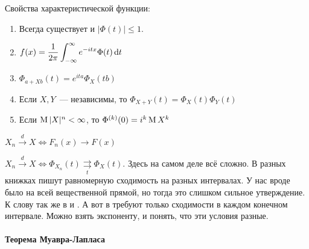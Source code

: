\documentclass[12pt,timbord]{../../../notes}
\begin{document}
\begin{prop}\label{prop:prob::charfun::charfun}
  Свойства характеристической функции:
  \begin{enumerate}
    \item Всегда существует и $|\Phi(t)| \leqslant 1$.
    \item $f(x) = \dfrac{1}{2\pi} \displaystyle\int_{-\infty}^\infty e^{-itx} \Phi(t) \,\mathrm{d} t $
    \item $\Phi_{a + Xb} (t) = e^{ita} \Phi_X (tb)$
    \item Если $X,Y$~--- независимы, то $\Phi_{X+Y}(t)=  \Phi_X(t) \Phi_Y(t)$
    \item Если $\operatorname{M} |X|^n < \infty$, то $\Phi^{(k)}(0)=  i^k \operatorname{M} X^k$
  \end{enumerate}
\end{prop}
\begin{defn}\label{defn:prob::charfun::distconv}
  $X_n \xrightarrow{d} X \Leftrightarrow F_n(x) \to F(x)$ 
\end{defn}
\begin{thrm}\label{thrm:prob::charfun::contchar}
  $X_n \xrightarrow{d} X \Leftrightarrow \Phi_{X_n} (t)
  \underset{t}{\rightrightarrows} \Phi_X(t)$.
  Здесь на самом деле всё сложно. В разных книжках пишут равномерную сходимость на разных
  интервалах. У нас вроде было на всей вещественной прямой, но тогда это слишком сильное
  утверждение. К слову так же в \cite{chernova1} и \cite{shiriaev}. А вот в \cite{msu} требуют
  только сходимости в каждом конечном интервале. Можно взять экспоненту, и понять, что эти
  условия разные. 
\end{thrm}
\paragraph{Теорема Муавра-Лапласа}
\label{par:prob::laplace}
\end{document}
